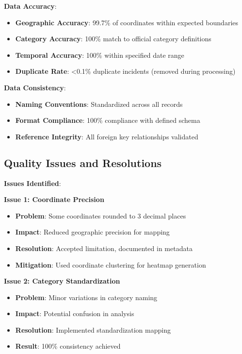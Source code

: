 \documentclass[12pt,a4paper]{article}
\begin{document}
\textbf{Data Accuracy}:
\begin{itemize}
    \item \textbf{Geographic Accuracy}: 99.7\% of coordinates within expected boundaries
    \item \textbf{Category Accuracy}: 100\% match to official category definitions
    \item \textbf{Temporal Accuracy}: 100\% within specified date range
    \item \textbf{Duplicate Rate}: <0.1\% duplicate incidents (removed during processing)
\end{itemize}

\textbf{Data Consistency}:
\begin{itemize}
    \item \textbf{Naming Conventions}: Standardized across all records
    \item \textbf{Format Compliance}: 100\% compliance with defined schema
    \item \textbf{Reference Integrity}: All foreign key relationships validated
\end{itemize}

\subsection{Quality Issues and Resolutions}

\textbf{Issues Identified}:

\textbf{Issue 1: Coordinate Precision}
\begin{itemize}
    \item \textbf{Problem}: Some coordinates rounded to 3 decimal places
    \item \textbf{Impact}: Reduced geographic precision for mapping
    \item \textbf{Resolution}: Accepted limitation, documented in metadata
    \item \textbf{Mitigation}: Used coordinate clustering for heatmap generation
\end{itemize}

\textbf{Issue 2: Category Standardization}
\begin{itemize}
    \item \textbf{Problem}: Minor variations in category naming
    \item \textbf{Impact}: Potential confusion in analysis
    \item \textbf{Resolution}: Implemented standardization mapping
    \item \textbf{Result}: 100\% consistency achieved
\end{itemize}
\end{document}
